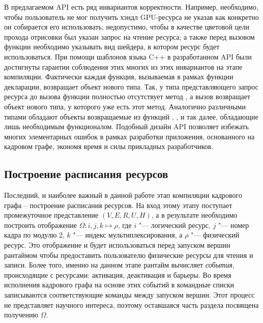 В предлагаемом API есть ряд инвариантов корректности.
Например, необходимо, чтобы пользователь не мог получить хэндл GPU-ресурса не указав как конкретно он собирается его использовать; недопустимо, чтобы в качестве цветовой цели прохода отрисовки был указан запрос на чтение ресурса; а также перед вызовом функции  необходимо указывать вид шейдера, в котором ресурс будет использоваться.
При помощи шаблонов языка C++ в разработанном API были достигнуты гарантии соблюдения этих многих из этих инвариантов на этапе компиляции.
Фактически каждая функция, вызываемая в рамках функции декларации, возвращает объект нового типа.
Так, у типа представляющего запрос ресурса до вызова функции  полностью отсутствует метод , а вызов  возвращает объект нового типа, у которого уже есть этот метод.
Аналогично различными типами обладают объекты возвращаемые из функций , ,  и так далее, обладающие лишь необходимым функционалом.
Подобный дизайн API позволяет избежать многих элементарных ошибок в рамках разработки приложения, основанного на кадровом графе, экономя время и силы прикладных разработчиков.

\subsection{Построение расписания ресурсов}
Последний, и наиболее важный в данной работе этап компиляции кадрового графа -- построение расписания ресурсов.
На вход этому этапу поступает промежуточное представление $(V, E, R, U, H)$, а в результате необходимо построить отображение $\Omega : i, j, k \mapsto \rho$, где $i$ "--- логический ресурс, $j$ "--- номер кадра по модулю 2, $k$ "--- индекс мультиплексирования, а $\rho$ "--- физический ресурс.
Это отображение и будет использоваться перед запуском вершин рантаймом чтобы предоставить пользователю физические ресурсы для чтения и записи.
Более того, именно на данном этапе рантайм вычисляет \textit{события}, происходящие с ресурсами: активация, деактивация и барьеры.
Во время исполнения кадрового графа на основе этих событий в командные списки записываются соответствующие команды между запуском вершин.
Этот процесс не представляет научного интереса, поэтому оставшаяся часть раздела посвящена получению $\Omega$.

